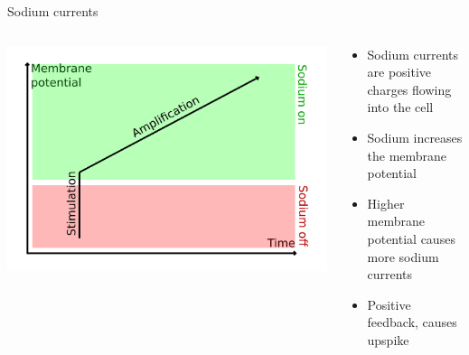 \documentclass[presentation]{beamer}
\begin{document}
\begin{frame}[label={sec:orgbcbc726}]{Sodium currents}
\begin{columns}
\begin{column}{0.5\columnwidth}
\begin{center}
\includegraphics[width=.9\linewidth]{./fastsodium.png}
\end{center}
\end{column}

\begin{column}{0.5\columnwidth}
\begin{itemize}
\item Sodium currents are positive charges flowing into the cell
\item Sodium increases the membrane potential
\item Higher membrane potential causes more sodium currents
\item Positive feedback, causes upspike
\end{itemize}
\end{column}
\end{columns}
\end{frame}
\end{document}
